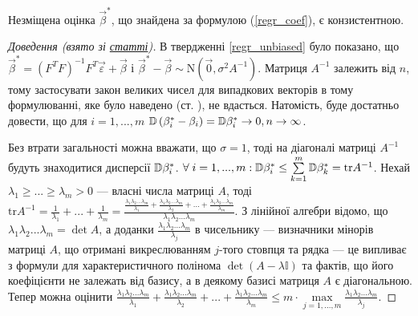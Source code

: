 \begin{proposition}
    Незміщена оцінка $\vec{\beta}^*$, що знайдена за формулою
    (\ref{regr_coef}), є конзистентною.
\end{proposition}
\begin{proof}[Доведення (взято зі \href{http://esgi-miet.ru/images/Stati20161/18-20GafarovaZavialovaMustafin.pdf}{статті})]
    В твердженні \ref{regr_unbiased} було показано, що
    $\vec{\beta}^* = (F^T F)^{-1} F^T \vec{\varepsilon} + \vec{\beta}$ і $\vec{\beta}^* - \vec{\beta} \sim \mathrm{N}(\vec{0},\sigma^2 A^{-1})$.
    Матриця $A^{-1}$ залежить від $n$, тому застосувати закон великих чисел
    для випадкових векторів в тому формулюванні, яке було наведено (ст. \pageref{multivar_lln}), не вдасться.
    Натомість, буде достатньо довести, що для $i=1,..., m$ $\mathbb{D}\left(\beta^*_i - \beta_i\right) = \mathbb{D}\beta^*_i \to 0 , n \to \infty$. 
    
    Без втрати загальності
    можна вважати, що $\sigma = 1$, тоді на діагоналі матриці $A^{-1}$ будуть знаходитися дисперсії $\mathbb{D}\beta_i^*$.
    $\forall \; i = 1,..., m : \mathbb{D}\beta_i^* \leq \sum\limits_{k=1}^m \mathbb{D}\beta_k^* = \mathrm{tr} A^{-1}$.
    Нехай $\lambda_1 \geq ... \geq \lambda_m > 0$ --- власні числа матриці $A$, тоді
    $\mathrm{tr} A^{-1} = \frac{1}{\lambda_1} + ... + \frac{1}{\lambda_m} = 
    \frac{
        \frac{\lambda_1 \lambda_2 ... \lambda_m}{\lambda_1} + 
        \frac{\lambda_1 \lambda_2 ... \lambda_m}{\lambda_2} + ... +
        \frac{\lambda_1 \lambda_2 ... \lambda_m}{\lambda_m}
    }{\lambda_1 \lambda_2 ... \lambda_m}$. З лінійної алгебри відомо, що
    $\lambda_1 \lambda_2 ... \lambda_m = \det A$, а доданки $\frac{\lambda_1 \lambda_2 ... \lambda_m}{\lambda_j}$ в чисельнику --- визначники мінорів матриці $A$,
    що отримані викреслюванням $j$-того стовпця та рядка --- це випливає з формули для характеристичного полінома
    $\det(A - \lambda \mathbb{I})$ та фактів, що його коефіцієнти не залежать від базису, а в деякому базисі матриця $A$ є діагональною.
    Тепер можна оцінити $\frac{\lambda_1 \lambda_2 ... \lambda_m}{\lambda_1} + 
    \frac{\lambda_1 \lambda_2 ... \lambda_m}{\lambda_2} + ... +
    \frac{\lambda_1 \lambda_2 ... \lambda_m}{\lambda_m} \leq m \cdot \underset{j=1,...,m}{\max}\frac{\lambda_1 \lambda_2 ... \lambda_m}{\lambda_j}$.


\end{proof}
